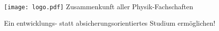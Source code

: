 \documentclass[DIV=calc]{scrartcl}
\begin{document}
\hspace{0.87\textwidth}
\begin{minipage}{120pt}
	\vspace{-1.8cm}
	\texttt{[image: logo.pdf]}
	\centering
	\small Zusammenkunft aller Physik-Fachschaften
\end{minipage}

\begin{center}
  \huge{Ein entwicklungs- statt ab\-si\-che\-rungs\-ori\-en\-tier\-tes Studium ermöglichen!}\vspace{.25\baselineskip}\\
  \normalsize
\end{center}
\vspace{1cm}






\end{document}
